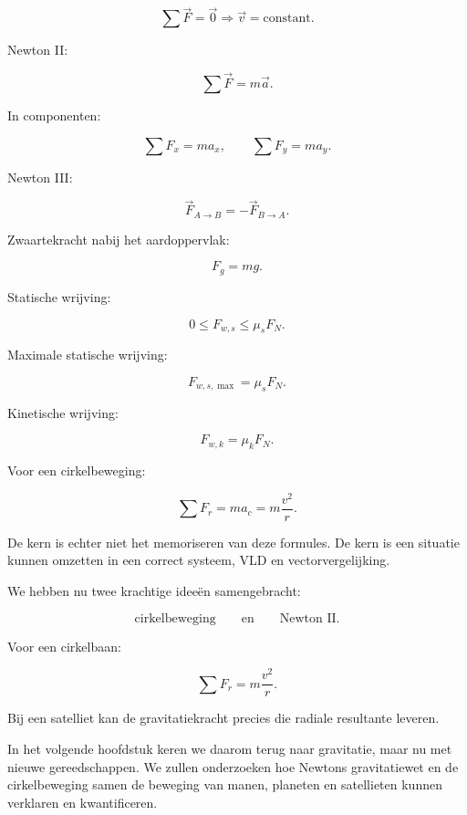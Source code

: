 \documentclass{ximera}
\begin{document}
\[
\boxed{
\sum\vec F=\vec 0
\Longrightarrow
\vec v=\text{constant}.
}
\]

Newton II:

\[
\boxed{
\sum\vec F=m\vec a.
}
\]

In componenten:

\[
\boxed{
\sum F_x=ma_x,
\qquad
\sum F_y=ma_y.
}
\]

Newton III:

\[
\boxed{
\vec F_{A\rightarrow B}
=
-\vec F_{B\rightarrow A}.
}
\]

Zwaartekracht nabij het aardoppervlak:

\[
\boxed{
F_g=mg.
}
\]

Statische wrijving:

\[
\boxed{
0\leq F_{w,s}\leq\mu_sF_N.
}
\]

Maximale statische wrijving:

\[
\boxed{
F_{w,s,\max}=\mu_sF_N.
}
\]

Kinetische wrijving:

\[
\boxed{
F_{w,k}=\mu_kF_N.
}
\]

Voor een cirkelbeweging:

\[
\boxed{
\sum F_r
=
ma_c
=
m\frac{v^2}{r}.
}
\]

De kern is echter niet het memoriseren van deze formules. De kern is
een situatie kunnen omzetten in een correct systeem, VLD en
vectorvergelijking.





We hebben nu twee krachtige ideeën samengebracht:

\[
\text{cirkelbeweging}
\qquad\text{en}\qquad
\text{Newton II}.
\]

Voor een cirkelbaan:

\[
\sum F_r=m\frac{v^2}{r}.
\]

Bij een satelliet kan de gravitatiekracht precies die radiale resultante
leveren.

In het volgende hoofdstuk keren we daarom terug naar gravitatie, maar
nu met nieuwe gereedschappen. We zullen onderzoeken hoe Newtons
gravitatiewet en de cirkelbeweging samen de beweging van manen,
planeten en satellieten kunnen verklaren en kwantificeren.
\end{document}
